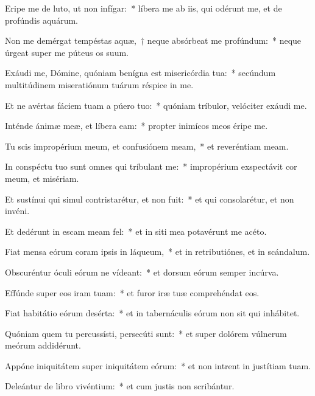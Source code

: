 \item Eripe me de luto, ut non infígar:~* líbera me ab iis, qui odérunt me, et de profúndis aquárum.

\item Non me demérgat tempéstas aquæ,~† neque absórbeat me profúndum:~* neque úrgeat super me púteus os suum.

\item Exáudi me, Dómine, quóniam benígna est misericórdia tua:~* secúndum multitúdinem miseratiónum tuárum réspice in me.

\item Et ne avértas fáciem tuam a púero tuo:~* quóniam tríbulor, velóciter exáudi me.

\item Inténde ánimæ meæ, et líbera eam:~* propter inimícos meos éripe me.

\item Tu scis impropérium meum, et confusiónem meam,~* et reveréntiam meam.

\item In conspéctu tuo sunt omnes qui tríbulant me:~* impropérium exspectávit cor meum, et misériam.

\item Et sustínui qui simul contristarétur, et non fuit:~* et qui consolarétur, et non invéni.

\item Et dedérunt in escam meam fel:~* et in siti mea potavérunt me acéto.

\item Fiat mensa eórum coram ipsis in láqueum,~* et in retributiónes, et in scándalum.

\item Obscuréntur óculi eórum ne vídeant:~* et dorsum eórum semper incúrva.

\item Effúnde super eos iram tuam:~* et furor iræ tuæ comprehéndat eos.

\item Fiat habitátio eórum desérta:~* et in tabernáculis eórum non sit qui inhábitet.

\item Quóniam quem tu percussísti, persecúti sunt:~* et super dolórem vúlnerum meórum addidérunt.

\item Appóne iniquitátem super iniquitátem eórum:~* et non intrent in justítiam tuam.

\item Deleántur de libro vivéntium:~* et cum justis non scribántur.

